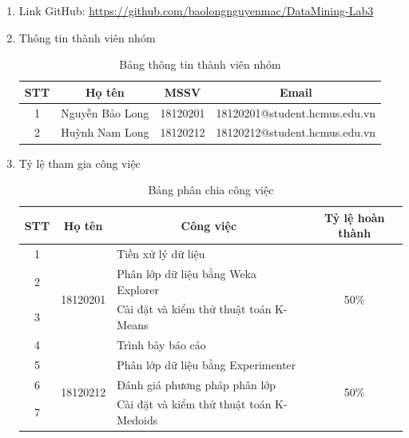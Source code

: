 \documentclass[a4paper, 12pt]{article}
\begin{document}
\begin{enumerate}
    \item Link GitHub: \url{https://github.com/baolongnguyenmac/DataMining-Lab3}
    \item Thông tin thành viên nhóm
    \begin{table}[H]
        \begin{center}
            \begin{tabular}{|c|c|c|c|}
            \hline
            STT & Họ tên          & MSSV     & Email                         \\ \hline
            1   & Nguyễn Bảo Long & 18120201 & 18120201@student.hcmus.edu.vn \\ \hline
            2   & Huỳnh Nam Long  & 18120212 & 18120212@student.hcmus.edu.vn         \\ \hline
            \end{tabular}
            \caption{Bảng thông tin thành viên nhóm}
        \end{center}
    \end{table}

    \item Tỷ lệ tham gia công việc
    \begin{table}[H]
        \begin{center}
            \begin{tabular}{|c|c|l|c|}
            \hline
            STT & Họ tên                    & \multicolumn{1}{c|}{Công việc}     & Tỷ lệ hoàn thành      \\ \hline
            1   & \multirow{4}{*}{18120201} & Tiền xử lý dữ liệu                 & \multirow{4}{*}{50\%} \\ \cline{1-1} \cline{3-3}
            2 &  & Phân lớp dữ liệu bằng Weka Explorer      &  \\ \cline{1-1} \cline{3-3}
            3 &  & Cài đặt và kiểm thử thuật toán K-Means   &  \\ \cline{1-1} \cline{3-3}
            4 &  & Trình bày báo cáo                        &  \\ \hline
            5   & \multirow{3}{*}{18120212} & Phân lớp dữ liệu bằng Experimenter & \multirow{3}{*}{50\%} \\ \cline{1-1} \cline{3-3}
            6 &  & Đánh giá phương pháp phân lớp            &  \\ \cline{1-1} \cline{3-3}
            7 &  & Cài đặt và kiểm thử thuật toán K-Medoids &  \\ \hline
            \end{tabular}
            \caption{Bảng phân chia công việc}
        \end{center}
    \end{table}
\end{enumerate}
\clearpage
\end{document}
